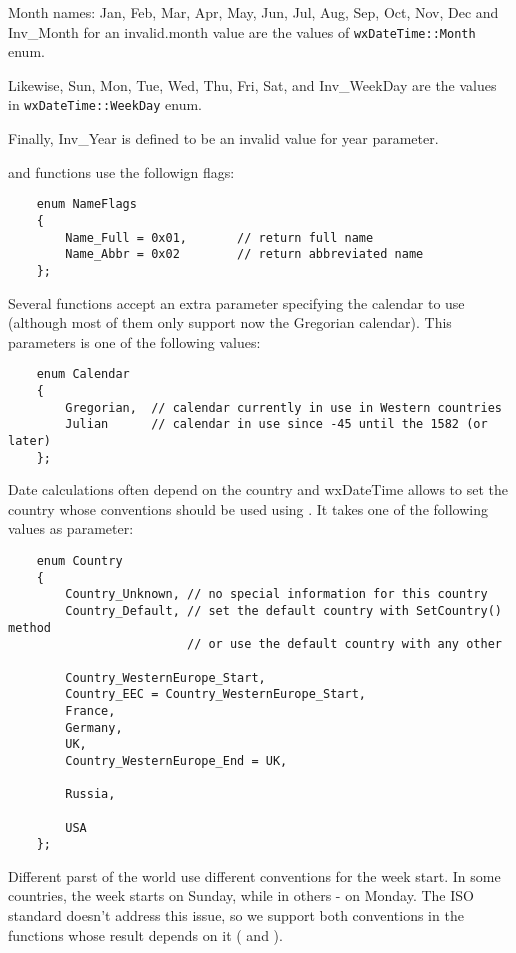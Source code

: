 Month names: Jan, Feb, Mar, Apr, May, Jun, Jul, Aug, Sep, Oct, Nov, Dec and
Inv\_Month for an invalid.month value are the values of {\tt wxDateTime::Month}
enum.

Likewise, Sun, Mon, Tue, Wed, Thu, Fri, Sat, and Inv\_WeekDay are the values in
{\tt wxDateTime::WeekDay} enum.

Finally, Inv\_Year is defined to be an invalid value for year parameter.

 and
 functions use the followign
flags:

\begin{verbatim}
    enum NameFlags
    {
        Name_Full = 0x01,       // return full name
        Name_Abbr = 0x02        // return abbreviated name
    };
\end{verbatim}

Several functions accept an extra parameter specifying the calendar to use
(although most of them only support now the Gregorian calendar). This
parameters is one of the following values:

\begin{verbatim}
    enum Calendar
    {
        Gregorian,  // calendar currently in use in Western countries
        Julian      // calendar in use since -45 until the 1582 (or later)
    };
\end{verbatim}

Date calculations often depend on the country and wxDateTime allows to set the
country whose conventions should be used using 
. It takes one of the following
values as parameter:

\begin{verbatim}
    enum Country
    {
        Country_Unknown, // no special information for this country
        Country_Default, // set the default country with SetCountry() method
                         // or use the default country with any other

        Country_WesternEurope_Start,
        Country_EEC = Country_WesternEurope_Start,
        France,
        Germany,
        UK,
        Country_WesternEurope_End = UK,

        Russia,

        USA
    };
\end{verbatim}

Different parst of the world use different conventions for the week start.
In some countries, the week starts on Sunday, while in others - on Monday.
The ISO standard doesn't address this issue, so we support both conventions in
the functions whose result depends on it ( and 
).

